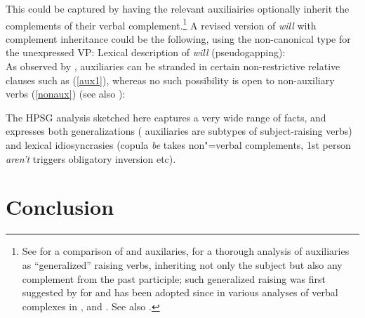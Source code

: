 \noindent
This could be captured by having the relevant auxiliairies optionally inherit the complements of their verbal complement.\footnote{See  for a comparison of  and  auxilaries,  for a thorough analysis of  auxiliaries as ``generalized'' raising verbs, inheriting not only the subject but also any complement from the past participle; such generalized raising was first suggested by \citet{HN89a,HN94a} for  and has been adopted since in various analyses of verbal complexes in  \citep{Kiss95a,Meurers2000b,Kathol2001a,Mueller99a,Mueller2002b},  \citep{BvN98a} and  \citep[Section~4]{MuellerPersian}. See also .}
A revised version of \emph{will} with complement inheritance could be the following, using the non-canonical  type  for the unexpressed VP:
\ea
Lexical description of \emph{will} (pseudogapping):\\
\z
As observed by \citet{ArnoldandBorsley2008}, auxiliaries can be stranded in certain non-restrictive
relative clauses such as (\ref{aux1}), whereas no such possibility is open to non-auxiliary verbs
(\ref{nonaux}) (see also \crossrefchapteralt[\page \pageref{page-relative-clauses:stranded-aux}]{relative-clauses}):

\eal
{}
\zl

The HPSG analysis sketched here captures a very wide range of facts, and expresses both generalizations ( auxiliaries are subtypes of subject-raising verbs) and lexical idiosyncrasies (copula \emph{be} takes non"=verbal complements, 1st person \emph{aren't} triggers obligatory inversion etc).


	
\section{Conclusion}

